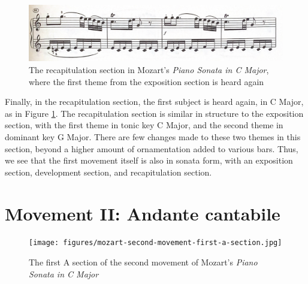 \begin{figure}
    \centering
    \includegraphics[width=\textwidth]{figures/mozart-first-movement-recapitulation-first-theme.jpg}
    \caption[The first theme of the exposition, found in the recapitulation, from Mozart's \textit{Piano Sonata in C Major, K. 330}]{The recapitulation section in Mozart's \textit{Piano Sonata in C Major}, where the first theme from the exposition section is heard again}
    \label{fig:mozart-first-movement-recapitulation-first-theme}
\end{figure}

Finally, in the recapitulation section, the first subject is heard again, in C Major, as in Figure \ref{fig:mozart-first-movement-recapitulation-first-theme}\autocite{Henle_1977}. The recapitulation section is similar in structure to the exposition section, with the first theme in tonic key C Major, and the second theme in dominant key G Major. There are few changes made to these two themes in this section, beyond a higher amount of ornamentation added to various bars. Thus, we see that the first movement itself is also in sonata form, with an exposition section, development section, and recapitulation section.

\section{Movement II: Andante cantabile}

\begin{figure}
    \centering
    \texttt{[image: figures/mozart-second-movement-first-a-section.jpg]}
    \caption{The first A section of the second movement of Mozart's \textit{Piano Sonata in C Major}}
    \label{fig:mozart-second-movement-first-a-section}
\end{figure}

